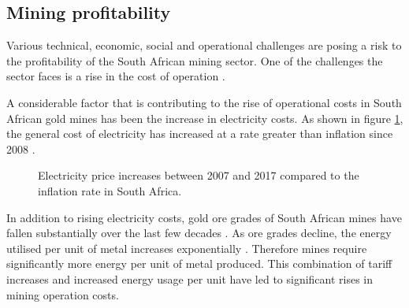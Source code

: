 	\subsection{Mining profitability}
	 	Various technical, economic, social and operational challenges are posing a risk to the profitability of the South African mining sector. One of the challenges the sector faces  is a rise in the cost of operation \cite{neingo2016trends}.\par
		A considerable factor that is contributing to the rise of operational costs in South African gold mines has been the increase in electricity costs. As shown in figure \ref{fig: Eskom tariffs}, the general cost of electricity has increased at a rate greater than inflation since 2008 \cite{Eskom2013Tariffs}.
		\begin{figure}[h!]
			\centering
			\fbox{}
			\caption[Electricity price increases between 2007 and 2017 compared to the inflation rate in South Africa..]{Electricity price increases between 2007 and 2017 \cite{Eskom2013Tariffs} compared to the inflation rate in South Africa.\protect\footnotemark[1] }
			\label{fig: Eskom tariffs}
		\end{figure}
		\par
		In addition to rising electricity costs, gold ore grades of South African mines have fallen substantially over the last few decades \cite{mudd2007global}. As ore grades decline, the energy utilised per unit of metal increases exponentially \cite{muller2010numerical}. Therefore mines require significantly more energy per unit of metal produced. This combination of tariff increases and increased energy usage per unit have led to significant rises in mining operation costs.
